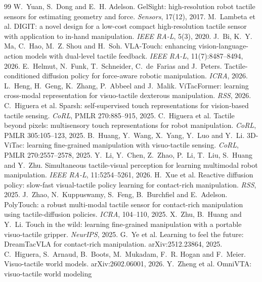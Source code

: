 \begin{thebibliography}{99}
 W.~Yuan, S.~Dong and E.~H. Adelson. GelSight: high-resolution
robot tactile sensors for estimating geometry and force. \emph{Sensors}, 17(12),
2017.
 M.~Lambeta et al. DIGIT: a novel design for a low-cost compact
high-resolution tactile sensor with application to in-hand manipulation.
\emph{IEEE RA-L}, 5(3), 2020.
 J.~Bi, K.~Y. Ma, C.~Hao, M.~Z. Shou and H.~Soh.
VLA-Touch: enhancing vision-language-action models with dual-level tactile
feedback. \emph{IEEE RA-L}, 11(7):8487--8494, 2026.
 E.~Helmut, N.~Funk, T.~Schneider, C.~de~Farias and
J.~Peters. Tactile-conditioned diffusion policy for force-aware robotic
manipulation. \emph{ICRA}, 2026.
 L.~Heng, H.~Geng, K.~Zhang, P.~Abbeel and
J.~Malik. ViTacFormer: learning cross-modal representation for visuo-tactile
dexterous manipulation. \emph{RSS}, 2026.
 C.~Higuera et al. Sparsh: self-supervised touch
representations for vision-based tactile sensing. \emph{CoRL}, PMLR
270:885--915, 2025.
 C.~Higuera et al. Tactile beyond pixels:
multisensory touch representations for robot manipulation. \emph{CoRL}, PMLR
305:105--123, 2025.
 B.~Huang, Y.~Wang, X.~Yang, Y.~Luo and Y.~Li. 3D-ViTac:
learning fine-grained manipulation with visuo-tactile sensing. \emph{CoRL}, PMLR
270:2557--2578, 2025.
 Y.~Li, Y.~Chen, Z.~Zhao, P.~Li, T.~Liu, S.~Huang and
Y.~Zhu. Simultaneous tactile-visual perception for learning multimodal robot
manipulation. \emph{IEEE RA-L}, 11:5254--5261, 2026.
 H.~Xue et al. Reactive diffusion policy: slow-fast
visual-tactile policy learning for contact-rich manipulation. \emph{RSS}, 2025.
 J.~Zhao, N.~Kuppuswamy, S.~Feng, B.~Burchfiel and
E.~Adelson. PolyTouch: a robust multi-modal tactile sensor for contact-rich
manipulation using tactile-diffusion policies. \emph{ICRA}, 104--110, 2025.
 X.~Zhu, B.~Huang and Y.~Li. Touch in the wild:
learning fine-grained manipulation with a portable visuo-tactile gripper.
\emph{NeurIPS}, 2025.
 G.~Ye et al. Learning to feel the future:
DreamTacVLA for contact-rich manipulation. arXiv:2512.23864, 2025.
 C.~Higuera, S.~Arnaud, B.~Boots, M.~Mukadam,
F.~R. Hogan and F.~Meier. Visuo-tactile world models. arXiv:2602.06001, 2026.
 Y.~Zheng et al. OmniVTA: visuo-tactile world modeling

\end{thebibliography}
